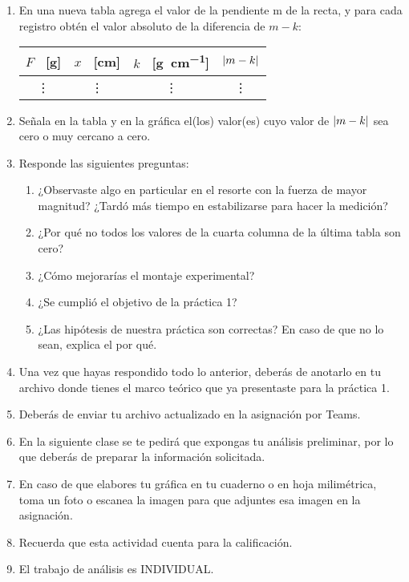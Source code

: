 \documentclass[14pt]{extarticle}
\begin{document}
\begin{enumerate}
$m = $ \rule{2cm}{0.3mm} [\unit{\gram\per\centi\meter}]
\item En una nueva tabla agrega el valor de la pendiente m de la recta, y para cada registro obtén el valor absoluto de la diferencia de $m - k$:
\begin{table}[H]
\centering
\begin{tabular}{c | c | c | c}
$F$ \, [\unit{\gram}] & $x$ \, [\unit{\centi\meter}] & $k$ \, [\unit{\gram\per\centi\meter}] & $\abs{m - k}$ \\ \hline
\vdots & \vdots & \vdots & \vdots \\
\end{tabular}
\end{table}
\item Señala en la tabla y en la gráfica el(los) valor(es) cuyo valor de $\abs{m - k}$ sea cero o muy cercano a cero.
\item Responde las siguientes preguntas:
\begin{enumerate}
\item ¿Observaste algo en particular en el resorte con la fuerza de mayor magnitud? ¿Tardó más tiempo en estabilizarse para hacer la medición?
\item ¿Por qué no todos los valores de la cuarta columna de la última tabla son cero?
\item ¿Cómo mejorarías el montaje experimental?
\item ¿Se cumplió el objetivo de la práctica 1?
\item ¿Las hipótesis de nuestra práctica son correctas? En caso de que no lo sean, explica el por qué.
\end{enumerate}
\item Una vez que hayas respondido todo lo anterior, deberás de anotarlo en tu archivo donde tienes el marco teórico que ya presentaste para la práctica 1.
\item Deberás de enviar tu archivo actualizado en la asignación por Teams.
\item En la siguiente clase se te pedirá que expongas tu análisis preliminar, por lo que deberás de preparar la información solicitada.
\item En caso de que elabores tu gráfica en tu cuaderno o en hoja milimétrica, toma un foto o escanea la imagen para que adjuntes esa imagen en la asignación.
\item Recuerda que esta actividad cuenta para la calificación.
\item El trabajo de análisis es INDIVIDUAL.
\end{enumerate}
\end{document}
